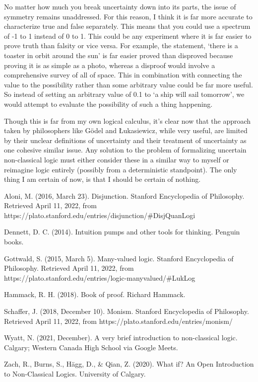 \documentclass{article}
\begin{document}
No matter how much you break uncertainty down into its parts, the issue of symmetry remains unaddressed. For this reason, I think it is far more accurate to characterize true and false separately. This means that you could use a spectrum of -1 to 1 instead of 0 to 1. This could be any experiment where it is far easier to prove truth than falsity or vice versa. For example, the statement, ‘there is a toaster in orbit around the sun' is far easier proved than disproved because proving it is as simple as a photo, whereas a disproof would involve a comprehensive survey of all of space. This in combination with connecting the value to the possibility rather than some arbitrary value could be far more useful. So instead of setting an arbitrary value of 0.1 to ‘a ship will sail tomorrow’, we would attempt to evaluate the possibility of such a thing happening.

Though this is far from my own logical calculus, it’s clear now that the approach taken by philosophers like Gödel and Łukasiewicz, while very useful, are limited by their unclear definitions of uncertainty and their treatment of uncertainty as one cohesive similar issue. Any solution to the problem of formalizing uncertain non-classical logic must either consider these in a similar way to myself or reimagine logic entirely (possibly from a deterministic standpoint). The only thing I am certain of now, is that I should be certain of nothing.

\begin{thebibliography}{99}

\bibitem{}
Aloni, M. (2016, March 23). Disjunction. Stanford Encyclopedia of Philosophy. Retrieved April 11, 2022, from https://plato.stanford.edu/entries/disjunction/\#DisjQuanLogi 

\bibitem{}
Dennett, D. C. (2014). Intuition pumps and other tools for thinking. Penguin books.

\bibitem{}
Gottwald, S. (2015, March 5). Many-valued logic. Stanford Encyclopedia of Philosophy. Retrieved April 11, 2022, from https://plato.stanford.edu/entries/logic-manyvalued/\#LukLog 

\bibitem{}
Hammack, R. H. (2018). Book of proof. Richard Hammack. 

\bibitem{}
Schaffer, J. (2018, December 10). Monism. Stanford Encyclopedia of Philosophy. Retrieved April 11, 2022, from https://plato.stanford.edu/entries/monism/ 

\bibitem{}
Wyatt, N. (2021, December). A very brief introduction to non-classical logic. Calgary; Western Canada High School via Google Meets. 

\bibitem{}
Zach, R., Burns, S., Hägg, D., \& Qian, Z. (2020). What if? An Open Introduction to Non-Classical Logics. University of Calgary. 

\end{thebibliography}
\end{document}

